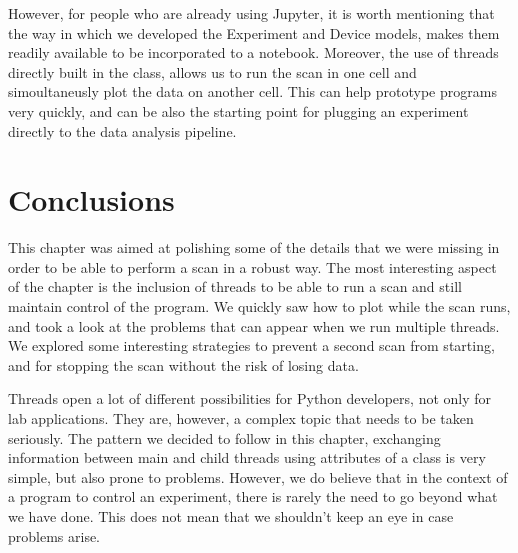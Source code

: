 However, for people who are already using Jupyter, it is worth mentioning that the way in which we developed the Experiment and Device models, makes them readily available to be incorporated to a notebook. Moreover, the use of threads directly built in the class, allows us to run the scan in one cell and simoultaneusly plot the data on another cell. This can help prototype programs very quickly, and can be also the starting point for plugging an experiment directly to the data analysis pipeline.

\section{Conclusions}\label{section:conclusions-run-experiment}
This chapter was aimed at polishing some of the details that we were missing in order to be able to perform a scan in a robust way. The most interesting aspect of the chapter is the inclusion of threads to be able to run a scan and still maintain control of the program. We quickly saw how to plot while the scan runs, and took a look at the problems that can appear when we run multiple threads. We explored some interesting strategies to prevent a second scan from starting, and for stopping the scan without the risk of losing data.

Threads open a lot of different possibilities for Python developers, not only for lab applications. They are, however, a complex topic that needs to be taken seriously. The pattern we decided to follow in this chapter, exchanging information between main and child threads using attributes of a class is very simple, but also prone to problems. However, we do believe that in the context of a program to control an experiment, there is rarely the need to go beyond what we have done. This does not mean that we shouldn't keep an eye in case problems arise.
